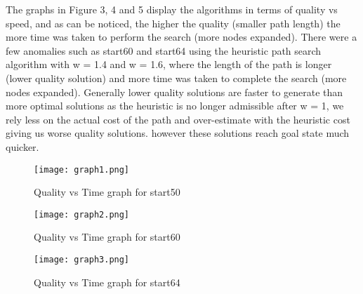 \documentclass{article}
\begin{document}
\begin{enumerate}[a)]
The graphs in Figure 3, 4 and 5 display the algorithms in terms of quality vs speed, and as can be noticed, the higher the quality (smaller path length) the more time was taken to perform the search (more nodes expanded). There were a few anomalies such as start60 and start64 using the heuristic path search algorithm with w = 1.4 and w = 1.6, where the length of the path is longer (lower quality solution) and more time was taken to complete the search (more nodes expanded). Generally lower quality solutions are faster to generate than more optimal solutions as the heuristic is no longer admissible after w = 1, we rely less on the actual cost of the path and over-estimate with the heuristic cost giving us worse quality solutions. however these solutions reach goal state much quicker.

\begin{figure}[h!]
      \begin{center}
            \texttt{[image: graph1.png]}
      \end{center}
            \caption{Quality vs Time graph for start50}
\end{figure}

\begin{figure}[h!]
      \begin{center}
            \texttt{[image: graph2.png]}
      \end{center}
            \caption{Quality vs Time graph for start60}
\end{figure}

\begin{figure}[h!]
      \begin{center}
            \texttt{[image: graph3.png]}
      \end{center}
            \caption{Quality vs Time graph for start64}
\end{figure}

\end{enumerate}
\end{document}
